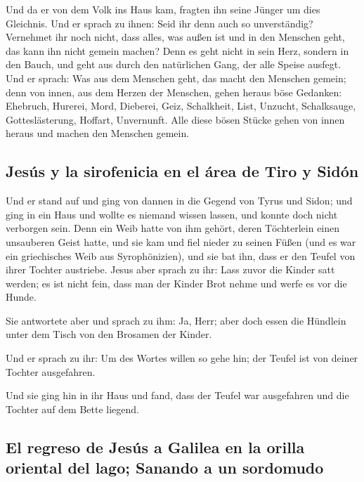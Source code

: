  Und da er von dem Volk ins Haus kam, fragten ihn seine
Jünger um dies Gleichnis.  Und er sprach zu ihnen: Seid
ihr denn auch so unverständig? Vernehmet ihr noch nicht, dass alles, was
außen ist und in den Menschen geht, das kann ihn nicht gemein machen?
 Denn es geht nicht in sein Herz, sondern in den Bauch,
und geht aus durch den natürlichen Gang, der alle Speise ausfegt.
 Und er sprach: Was aus dem Menschen geht, das macht den
Menschen gemein;  denn von innen, aus dem Herzen der
Menschen, gehen heraus böse Gedanken: Ehebruch, Hurerei, Mord,
 Dieberei, Geiz, Schalkheit, List, Unzucht, Schalksauge,
Gotteslästerung, Hoffart, Unvernunft.  Alle diese bösen
Stücke gehen von innen heraus und machen den Menschen gemein.

\hypertarget{jesuxfas-y-la-sirofenicia-en-el-uxe1rea-de-tiro-y-siduxf3n}{%
\subsection{Jesús y la sirofenicia en el área de Tiro y
Sidón}\label{jesuxfas-y-la-sirofenicia-en-el-uxe1rea-de-tiro-y-siduxf3n}}

 Und er stand auf und ging von dannen in die Gegend von
Tyrus und Sidon; und ging in ein Haus und wollte es niemand wissen
lassen, und konnte doch nicht verborgen sein.  Denn ein
Weib hatte von ihm gehört, deren Töchterlein einen unsauberen Geist
hatte, und sie kam und fiel nieder zu seinen Füßen  (und
es war ein griechisches Weib aus Syrophönizien), und sie bat ihn, dass
er den Teufel von ihrer Tochter austriebe.  Jesus aber
sprach zu ihr: Lass zuvor die Kinder satt werden; es ist nicht fein,
dass man der Kinder Brot nehme und werfe es vor die Hunde.

 Sie antwortete aber und sprach zu ihm: Ja, Herr; aber
doch essen die Hündlein unter dem Tisch von den Brosamen der Kinder.

 Und er sprach zu ihr: Um des Wortes willen so gehe hin;
der Teufel ist von deiner Tochter ausgefahren.

 Und sie ging hin in ihr Haus und fand, dass der Teufel
war ausgefahren und die Tochter auf dem Bette liegend.

\hypertarget{el-regreso-de-jesuxfas-a-galilea-en-la-orilla-oriental-del-lago-sanando-a-un-sordomudo}{%
\subsection{El regreso de Jesús a Galilea en la orilla oriental del
lago; Sanando a un
sordomudo}\label{el-regreso-de-jesuxfas-a-galilea-en-la-orilla-oriental-del-lago-sanando-a-un-sordomudo}}

